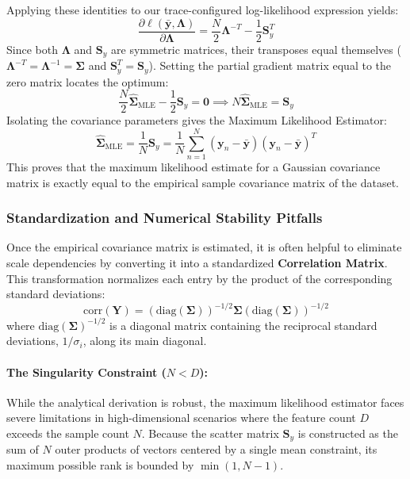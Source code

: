 \documentclass{article}
\begin{document}
Applying these identities to our trace-configured log-likelihood expression yields:
\begin{equation}
\frac{\partial \ell(\bar{\mathbf{y}}, \boldsymbol{\Lambda})}{\partial \boldsymbol{\Lambda}} = \frac{N}{2}\boldsymbol{\Lambda}^{-T} - \frac{1}{2}\mathbf{S}_y^T
\end{equation}
Since both $\boldsymbol{\Lambda}$ and $\mathbf{S}_y$ are symmetric matrices, their transposes equal themselves ($\boldsymbol{\Lambda}^{-T} = \boldsymbol{\Lambda}^{-1} = \boldsymbol{\Sigma}$ and $\mathbf{S}_y^T = \mathbf{S}_y$). Setting the partial gradient matrix equal to the zero matrix locates the optimum:
\begin{equation}
\frac{N}{2}\hat{\boldsymbol{\Sigma}}_{\text{MLE}} - \frac{1}{2}\mathbf{S}_y = \mathbf{0} \implies N\hat{\boldsymbol{\Sigma}}_{\text{MLE}} = \mathbf{S}_y
\end{equation}
Isolating the covariance parameters gives the Maximum Likelihood Estimator:
\begin{equation}
\hat{\boldsymbol{\Sigma}}_{\text{MLE}} = \frac{1}{N}\mathbf{S}_y = \frac{1}{N}\sum_{n=1}^N (\mathbf{y}_n - \bar{\mathbf{y}})(\mathbf{y}_n - \bar{\mathbf{y}})^T
\end{equation}
This proves that the maximum likelihood estimate for a Gaussian covariance matrix is exactly equal to the empirical sample covariance matrix of the dataset.

\subsubsection{Standardization and Numerical Stability Pitfalls}

Once the empirical covariance matrix is estimated, it is often helpful to eliminate scale dependencies by converting it into a standardized \textbf{Correlation Matrix}. This transformation normalizes each entry by the product of the corresponding standard deviations:
\begin{equation}
\text{corr}(\mathbf{Y}) = \left(\text{diag}(\boldsymbol{\Sigma})\right)^{-1/2} \boldsymbol{\Sigma} \left(\text{diag}(\boldsymbol{\Sigma})\right)^{-1/2}
\end{equation}
where $\text{diag}(\boldsymbol{\Sigma})^{-1/2}$ is a diagonal matrix containing the reciprocal standard deviations, $1/\sigma_i$, along its main diagonal.

\paragraph{The Singularity Constraint ($N < D$):}
While the analytical derivation is robust, the maximum likelihood estimator faces severe limitations in high-dimensional scenarios where the feature count $D$ exceeds the sample count $N$. Because the scatter matrix $\mathbf{S}_y$ is constructed as the sum of $N$ outer products of vectors centered by a single mean constraint, its maximum possible rank is bounded by $\min(1, N-1)$. 
\end{document}
